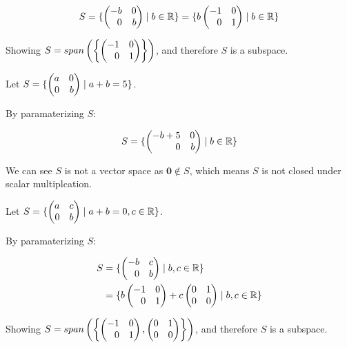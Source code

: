 \documentclass[12pt]{article}
\newenvironment{abc}{\begin{enumerate}[label={\bf(\alph*)}]}{\end{enumerate}}
\newcommand\m[2][]{
	\ifthenelse{\equal {#1} {}}
		{\begin{pmatrix*}[r]#2\end{pmatrix*}}
		{\left(\begin{array}{#1}#2\end{array}\right)}
}
\newcommand\resetequation[1][1]{\setcounter{equation}{#1 - 1}}
\renewcommand{\vec}[1]{\mathbf{#1}}
\begin{document}
\begin{abc}
\begin{item}
	\begin{equation}
		S = \{ \m{-b & 0 \\ 0 & b} \mid b \in \mathbb{R} \} = \{ b \m{-1 & 0 \\ 0 & 1} \mid b \in \mathbb{R} \}
	\end{equation}

	Showing $S = span\left( \left\{ \m{-1 & 0 \\ 0 & 1} \right\} \right)$, and therefore $S$ is a subspace.
\end{item}

\begin{item}
	\resetequation
	Let $S = \{ \m{a & 0 \\ 0 & b} \mid a + b = 5 \}$.

	By paramaterizing $S$:

	\begin{equation}
		S = \{ \m{ -b + 5 & 0 \\ 0 & b} \mid b \in \mathbb{R} \}
	\end{equation}
	
	We can see $S$ is not a vector space as $ \vec{0} \notin S$, which
	means $S$ is not closed under scalar multiplcation.
\end{item}

\begin{item}
	\resetequation
	Let $S = \{ \m{a & c \\ 0 & b} \mid a + b = 0, c \in \mathbb{R} \}$.

	By paramaterizing $S$:

	\begin{equation}
	\begin{aligned}
		S &= \{ \m{ -b & c \\ 0 & b} \mid b, c \in \mathbb{R} \} \\
		  &= \{ b \m{ -1 & 0 \\ 0 & 1} + c \m { 0 & 1 \\ 0 & 0 } \mid b, c \in \mathbb{R} \}
	\end{aligned}
	\end{equation}
	
	Showing $S = span\left( \left\{ \m{-1 & 0 \\ 0 & 1}, \m{0 & 1 \\ 0 & 0} \right\} \right)$, and therefore $S$ is a subspace.
\end{item}
\end{abc}
\end{document}
